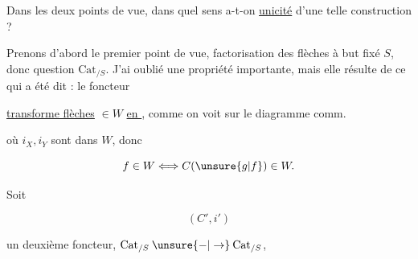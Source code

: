 
Dans les deux points de vue, dans quel sens a-t-on \uline{unicité} d'une telle construction ?

Prenons d'abord le premier point de vue, factorisation des flèches à but fixé $S$, donc question  $\mathrm{Cat}_{/S}$. J'ai oublié une propriété importante, mais elle résulte de ce qui a été dit : le foncteur


\uline{transforme flèches} $\in W$ \uline{en }, comme on voit sur le diagramme comm.


où $i_X,i_Y$ sont dans $W$, donc

\[
f\in W\Longleftrightarrow C(\unsure{g|f})\in W.
\]

Soit

\[
(C',i')
\]

un deuxième foncteur, $\mathrm{Cat}_{/S}\mathbin{\unsure{-|\to}}\mathrm{Cat}_{/S}$,
